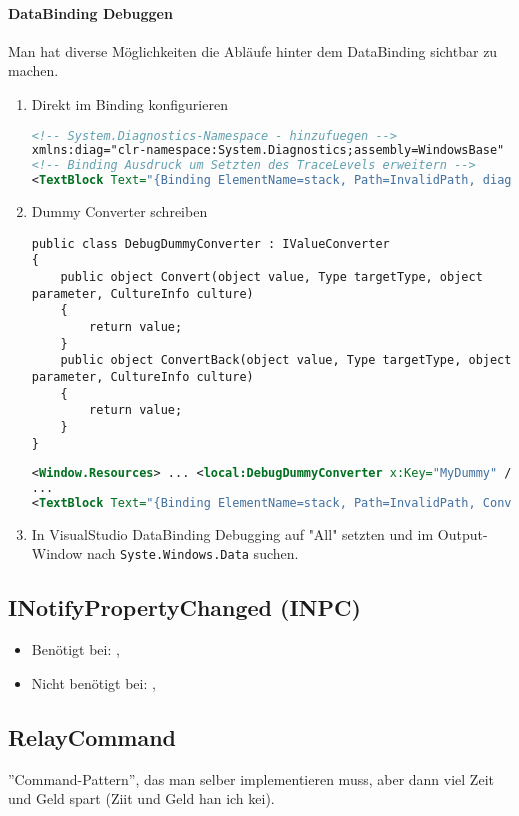 \paragraph{DataBinding Debuggen} Man hat diverse Möglichkeiten die Abläufe hinter dem DataBinding sichtbar zu machen.
\begin{enumerate}
\item Direkt im Binding konfigurieren
\begin{lstlisting}[language=xml]
<!-- System.Diagnostics-Namespace - hinzufuegen -->
xmlns:diag="clr-namespace:System.Diagnostics;assembly=WindowsBase"
<!-- Binding Ausdruck um Setzten des TraceLevels erweitern -->
<TextBlock Text="{Binding ElementName=stack, Path=InvalidPath, diag:PresentationTraceSources.TraceLevel=High}" />
\end{lstlisting}
\item Dummy Converter schreiben
\begin{lstlisting}
public class DebugDummyConverter : IValueConverter
{
    public object Convert(object value, Type targetType, object parameter, CultureInfo culture)
    {
        return value;
    }
    public object ConvertBack(object value, Type targetType, object parameter, CultureInfo culture)
    {
        return value;
    }
}
\end{lstlisting}
\begin{lstlisting}[language=xml]
<Window.Resources> ... <local:DebugDummyConverter x:Key="MyDummy" /> ... </Window.Resources>
...
<TextBlock Text="{Binding ElementName=stack, Path=InvalidPath, Converter={StaticResource MyDummy}}" />
\end{lstlisting}
\item In VisualStudio DataBinding Debugging auf "{}All"{} setzten und im Output-Window nach \verb+Syste.Windows.Data+ suchen.
\end{enumerate}

\subsection{INotifyPropertyChanged (INPC)}
\begin{itemize}
    \item Benötigt bei: , 
    \item Nicht benötigt bei: , 
\end{itemize}

\subsection{RelayCommand}
''Command-Pattern'', das man selber implementieren muss, aber dann viel Zeit und Geld spart (Ziit und Geld han ich kei).

